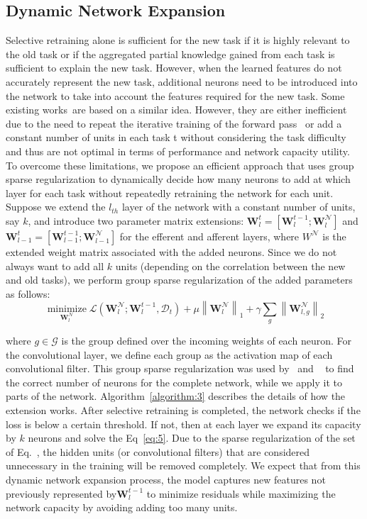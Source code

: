 \subsection{Dynamic Network Expansion}
Selective retraining alone is sufficient for the new task if it is highly relevant to the old task or if the aggregated partial knowledge gained from each task is sufficient to explain the new task. However, when the learned features do not accurately represent the new task, additional neurons need to be introduced into the network to take into account the features required for the new task. Some existing works~\cite{rusu2016progressive}are based on a similar idea. However, they are either inefficient due to the need to repeat the iterative training of the forward pass~\cite{zhou2012online} or add a constant number of units in each task t without considering the task difficulty~\cite{rusu2016progressive} and thus are not optimal in terms of performance and network capacity utility.
To overcome these limitations, we propose an efficient approach that uses group sparse regularization to dynamically decide how many neurons to add at which layer for each task without repeatedly retraining the network for each unit. Suppose we extend the $l_{th}$ layer of the network with a constant number of units, say $k$, and introduce two parameter matrix extensions: $\boldsymbol{W}_{l}^{t}=\left[\boldsymbol{W}_{l}^{t-1} ; \boldsymbol{W}_{l}^{\mathcal{N}}\right]$ and $\boldsymbol{W}_{l-1}^{t}=\left[\boldsymbol{W}_{l-1}^{t-1} ; \boldsymbol{W}_{l-1}^{\mathcal{N}}\right]$ for the efferent and afferent layers, where $W^{\mathcal{N}}$ is the extended weight matrix associated with the added neurons. Since we do not always want to add all $k$ units (depending on the correlation between the new and old tasks), we perform group sparse regularization of the added parameters as follows:
$$
\underset{\boldsymbol{W}_{l}^{\mathcal{N}}}{\operatorname{minimize}} \mathcal{L}\left(\boldsymbol{W}_{l}^{\mathcal{N}} ; \boldsymbol{W}_{l}^{t-1}, \mathcal{D}_{t}\right)+\mu\left\|\boldsymbol{W}_{l}^{\mathcal{N}}\right\|_{1}+\gamma \sum_{g}\left\|\boldsymbol{W}_{l, g}^{\mathcal{N}}\right\|_{2}
\label{eq:5}
$$

where $g \in \mathcal{G}$ is the group defined over the incoming weights of each neuron. For the convolutional layer, we define each group as the activation map of each convolutional filter. This group sparse regularization was used by~\cite{wen2016learning} and ~\cite{alvarez2016learning} to find the correct number of neurons for the complete network, while we apply it to parts of the network. Algorithm~\ref{algorithm:3} describes the details of how the extension works.
After selective retraining is completed, the network checks if the loss is below a certain threshold. If not, then at each layer we expand its capacity by $k$ neurons and solve the Eq~\ref{eq:5}. Due to the sparse regularization of the set of Eq.~\cite{eq:5}, the hidden units (or convolutional filters) that are considered unnecessary in the training will be removed completely. We expect that from this dynamic network expansion process, the model captures new features not previously represented by$\boldsymbol{W}_{l}^{t-1}$ to minimize residuals while maximizing the network capacity by avoiding adding too many units.

